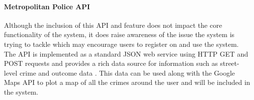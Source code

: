 \paragraph{Metropolitan Police API}
Although the inclusion of this API and feature does not impact the core functionality of the system, it does raise awareness of the issue the system is trying to tackle which may encourage users to register on and use the system. The API is implemented as a standard JSON web service using HTTP GET and POST requests and provides a rich data source for information such as street-level crime and outcome data \cite{Police:API}. This data can be used along with the Google Maps API to plot a map of all the crimes around the user and will be included in the system.

\newpage